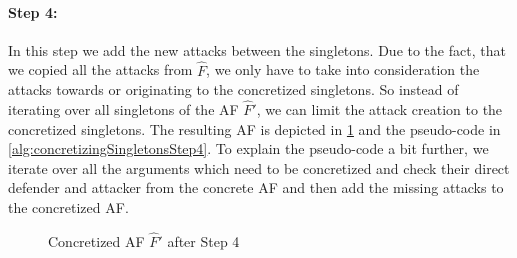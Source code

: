 \paragraph{Step 4:} In this step we add the new attacks between the singletons. Due to the fact, that we copied all the attacks from $\hat{F}$, we only have to take into consideration the attacks towards or originating to the concretized singletons. So instead of iterating over all singletons of the AF $\hat{F}'$, we can limit the attack creation to the concretized singletons. The resulting AF is depicted in \cref{example:algorithmConcretizeSingletonsStep4} and the pseudo-code in \cref{alg:concretizingSingletonsStep4}. To explain the pseudo-code a bit further, we iterate over all the arguments which need to be concretized and check their direct defender and attacker from the concrete AF and then add the missing attacks to the concretized AF.


\vspace{0.3cm}
\begin{figure}[h]
    \centering
    \caption{Concretized AF $\hat{F}'$ after Step 4}
    \label{example:algorithmConcretizeSingletonsStep4}
\end{figure}
\vspace{-0.2cm}


